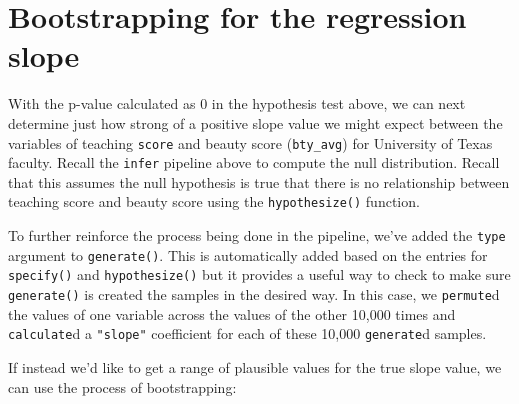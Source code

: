 \documentclass[12pt, krantz2,]{krantz}
\makeatletter
\newenvironment{Shaded}{\begin{snugshade}}{\end{snugshade}}
\newcommand{\DataTypeTok}[1]{\textcolor[rgb]{0.27,0.27,0.27}{#1}}
\newcommand{\DecValTok}[1]{\textcolor[rgb]{0.06,0.06,0.06}{#1}}
\newcommand{\KeywordTok}[1]{\textcolor[rgb]{0.27,0.27,0.27}{\textbf{#1}}}
\newcommand{\NormalTok}[1]{#1}
\newcommand{\OperatorTok}[1]{\textcolor[rgb]{0.43,0.43,0.43}{\textbf{#1}}}
\newcommand{\StringTok}[1]{\textcolor[rgb]{0.5,0.5,0.5}{#1}}
\newenvironment{kframe}{%
\medskip{}
\setlength{\fboxsep}{.8em}
 \def\at@end@of@kframe{}%
 \ifinner\ifhmode%
  \def\at@end@of@kframe{\end{minipage}}%
  \begin{minipage}{\columnwidth}%
 \fi\fi%
 \def\FrameCommand##1{\hskip\@totalleftmargin \hskip-\fboxsep
 \colorbox{shadecolor}{##1}\hskip-\fboxsep
     \hskip-\linewidth \hskip-\@totalleftmargin \hskip\columnwidth}%
 \MakeFramed {\advance\hsize-\width
   \@totalleftmargin\z@ \linewidth\hsize
   \@setminipage}}%
 {\par\unskip\endMakeFramed%
 \at@end@of@kframe}
\renewenvironment{Shaded}{\begin{kframe}}{\end{kframe}}
\makeatother
\begin{document}
\hypertarget{bootstrapping-for-the-regression-slope}{%
\section{Bootstrapping for the regression slope}\label{bootstrapping-for-the-regression-slope}}

With the p-value calculated as 0 in the hypothesis test above, we can next determine just how strong of a positive slope value we might expect between the variables of teaching \texttt{score} and beauty score (\texttt{bty\_avg}) for University of Texas faculty. Recall the \texttt{infer} pipeline above to compute the null distribution. Recall that this assumes the null hypothesis is true that there is no relationship between teaching score and beauty score using the \texttt{hypothesize()} function.

\begin{Shaded}
\end{Shaded}

To further reinforce the process being done in the pipeline, we've added the \texttt{type} argument to \texttt{generate()}. This is automatically added based on the entries for \texttt{specify()} and \texttt{hypothesize()} but it provides a useful way to check to make sure \texttt{generate()} is created the samples in the desired way. In this case, we \texttt{permute}d the values of one variable across the values of the other 10,000 times and \texttt{calculate}d a \texttt{"slope"} coefficient for each of these 10,000 \texttt{generate}d samples.

If instead we'd like to get a range of plausible values for the true slope value, we can use the process of bootstrapping:

\begin{Shaded}
\end{Shaded}
\end{document}
